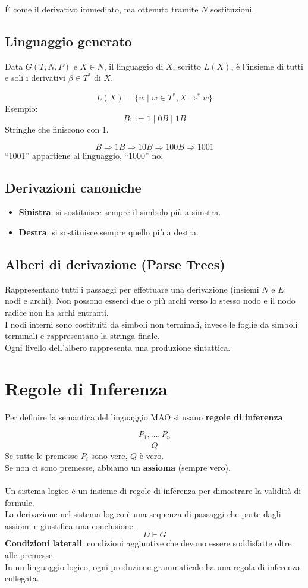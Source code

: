 \documentclass[a4paper,12pt]{article}
\let\oldsection\section
\renewcommand{\section}{\clearpage\oldsection}
\begin{document}
È come il derivativo immediato, ma ottenuto tramite $N$ sostituzioni.

\subsection{Linguaggio generato}

Data $G(T,N,P)$ e $X \in N$, il linguaggio di $X$, scritto $L(X)$, è l’insieme di tutti e soli i derivativi $\beta \in T^*$ di $X$.

\[
L(X) = \{w \mid w \in T^*, X \Rightarrow^* w\}
\]
Esempio:
\[
B ::= 1 \;|\; 0B \;|\; 1B
\]
Stringhe che finiscono con 1.

\[
B \Rightarrow 1B \Rightarrow 10B \Rightarrow 100B \Rightarrow 1001
\]
“1001” appartiene al linguaggio, “1000” no.

\subsection{Derivazioni canoniche}

\begin{itemize}
  \item \textbf{Sinistra}: si sostituisce sempre il simbolo più a sinistra.
  \item \textbf{Destra}: si sostituisce sempre quello più a destra.
\end{itemize}

\subsection{Alberi di derivazione (Parse Trees)}

Rappresentano tutti i passaggi per effettuare una derivazione (insiemi $N$ e $E$: nodi e archi).  
Non possono esserci due o più archi verso lo stesso nodo e il nodo radice non ha archi entranti.\\
I nodi interni sono costituiti da simboli non terminali, invece le foglie da simboli terminali e rappresentano la stringa finale.\\
Ogni livello dell'albero rappresenta una produzione sintattica.
\section{Regole di Inferenza}

Per definire la semantica del linguaggio MAO si usano \textbf{regole di inferenza}.

\[
\frac{P_1, \dots, P_n}{Q}
\]
Se tutte le premesse $P_i$ sono vere, $Q$ è vero.\\  
Se non ci sono premesse, abbiamo un \textbf{assioma} (sempre vero).\\\\
Un sistema logico è un insieme di regole di inferenza per dimostrare la validità di formule.\\
La derivazione nel sistema logico è una sequenza di passaggi che parte dagli assiomi e giustifica una conclusione.
\[
D \vdash G
\]
\textbf{Condizioni laterali}: condizioni aggiuntive che devono essere soddisfatte oltre alle premesse.\\
In un linguaggio logico, ogni produzione grammaticale ha una regola di inferenza collegata.
\end{document}
